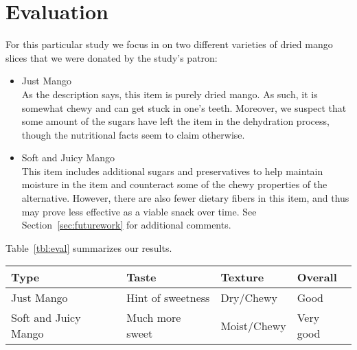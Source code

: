 \section{Evaluation}

For this particular study we focus in on two different varieties of dried mango slices that we were donated by the study's patron:

\begin{itemize}
    \item Just Mango \\
        As the description says, this item is purely dried mango.
        As such, it is somewhat chewy and can get stuck in one's teeth.
        Moreover, we suspect that some amount of the sugars have left the item in the dehydration process, though the nutritional facts seem to claim otherwise.
    \item Soft and Juicy Mango \\
        This item includes additional sugars and preservatives to help maintain moisture in the item and counteract some of the chewy properties of the alternative.
        However, there are also fewer dietary fibers in this item, and thus may prove less effective as a viable snack over time.
        See Section~\ref{sec:futurework} for additional comments.
\end{itemize}

Table~\ref{tbl:eval} summarizes our results.

\begin{table*}[t]
    \centering
    \begin{tabular}{|l|l|l|l|}
        \hline
        Type                    & Taste               & Texture     & Overall \\
        \hline
        Just Mango              & Hint of sweetness   & Dry/Chewy   & Good \\
        \hline
        Soft and Juicy Mango    & Much more sweet     & Moist/Chewy & Very good \\
        \hline
    \end{tabular}
    \caption{Evaluation Results}
    \label{tbl:eval}
\end{table*}
